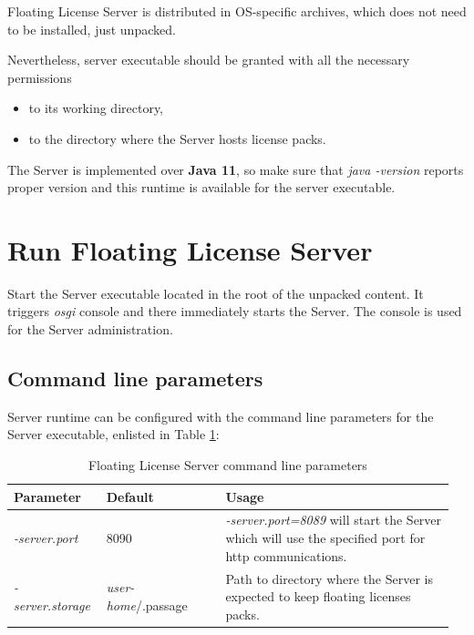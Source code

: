 \documentclass[12pt]{report}
\begin{document}
Floating License Server is distributed in OS-specific archives, which does not need to be installed, just unpacked. 

Nevertheless, server executable should be granted with all the necessary permissions
\begin{itemize}
  \item to its working directory,
  \item to the directory where the Server hosts license packs.
\end{itemize} 

The Server is implemented over \textbf{Java 11}, 
so make sure that \textit {java -version} reports proper version and this runtime is available for the server executable.

\chapter*{Run Floating License Server} \label{ch:run-fls}

Start the Server executable located in the root of the unpacked content. 
It triggers \textit{osgi} console and there immediately starts the Server. The console is used for the Server administration.

\section*{Command line parameters} \label{ch:run-fls-cli}

Server runtime can be configured with the command line parameters for the Server executable, enlisted in Table \ref{tabular:server-params}:

\begin{table}[ht]
\caption{Floating License Server command line parameters}
\label{tabular:server-params}
\begin{center}
	\begin{tabular}{p{0.2\linewidth}p{0.26\linewidth}p{0.5\linewidth}}
		\textbf{Parameter} & \textbf{Default} & \textbf{Usage} \\  \hline
		\textit{-server.port} & 8090 & \textit{-server.port=8089} will start the Server which will use the specified port for http communications.\\  \hline
		\textit{-server.storage} & \textit{user-home}/.passage & Path to directory where the Server is expected to keep floating licenses packs. \\  \hline
	\end{tabular}
\end{center}
\end{table}
\end{document}
